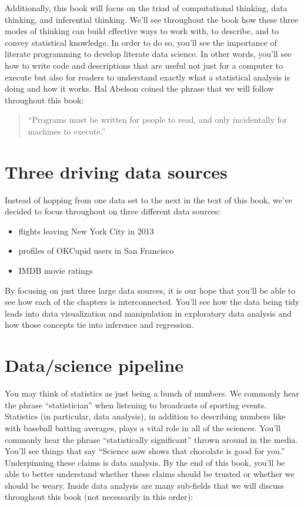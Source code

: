 \documentclass[]{tufte-book}
\providecommand{\tightlist}{%
  \setlength{\itemsep}{0pt}\setlength{\parskip}{0pt}}
\theoremstyle{definition}
\theoremstyle{definition}
\theoremstyle{remark}
\begin{document}
Additionally, this book will focus on the triad of computational
thinking, data thinking, and inferential thinking. We'll see throughout
the book how these three modes of thinking can build effective ways to
work with, to describe, and to convey statistical knowledge. In order to
do so, you'll see the importance of literate programming to develop
literate data science. In other words, you'll see how to write code and
descriptions that are useful not just for a computer to execute but also
for readers to understand exactly what a statistical analysis is doing
and how it works. Hal Abelson coined the phrase that we will follow
throughout this book:

\begin{quote}
``Programs must be written for people to read, and only incidentally for
machines to execute.''
\end{quote}

\section{Three driving data sources}\label{three-driving-data-sources}

Instead of hopping from one data set to the next in the text of this
book, we've decided to focus throughout on three different data sources:

\begin{itemize}
\tightlist
\item
  flights leaving New York City in 2013
\item
  profiles of OKCupid users in San Francisco
\item
  IMDB movie ratings
\end{itemize}

By focusing on just three large data sources, it is our hope that you'll
be able to see how each of the chapters is interconnected. You'll see
how the data being tidy leads into data visualization and manipulation
in exploratory data analysis and how those concepts tie into inference
and regression.

\section{Data/science pipeline}\label{datascience-pipeline}

You may think of statistics as just being a bunch of numbers. We
commonly hear the phrase ``statistician'' when listening to broadcasts
of sporting events. Statistics (in particular, data analysis), in
addition to describing numbers like with baseball batting averages,
plays a vital role in all of the sciences. You'll commonly hear the
phrase ``statistically significant'' thrown around in the media. You'll
see things that say ``Science now shows that chocolate is good for
you.'' Underpinning these claims is data analysis. By the end of this
book, you'll be able to better understand whether these claims should be
trusted or whether we should be weary. Inside data analysis are many
sub-fields that we will discuss throughout this book (not necessarily in
this order):
\end{document}
